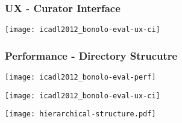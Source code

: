 \documentclass{beamer}
\begin{document}
\begin{frame}

\frametitle{UX - Curator Interface}

\begin{center}
\texttt{[image: icadl2012\_bonolo-eval-ux-ci]}
\end{center}

\end{frame}

\begin{frame}

\frametitle{Performance - Directory Strucutre}
\begin{center}
\texttt{[image: icadl2012\_bonolo-eval-perf]}
\end{center}
\end{frame}

\begin{frame}
\begin{center}
\texttt{[image: icadl2012\_bonolo-eval-ux-ci]}
\end{center}
\end{frame}

\begin{frame}
\begin{center}
\texttt{[image: hierarchical-structure.pdf]}
\end{center}
\end{frame}
\end{document}
